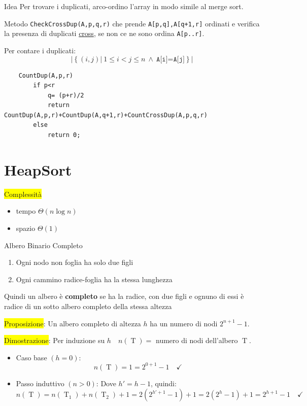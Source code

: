 \documentclass{article}
\begin{document}
\begin{info}{Idea}{}
    Per trovare i duplicati, arco-ordino l'array in modo simile al merge sort.

    Metodo \texttt{CheckCrossDup(A,p,q,r)} che prende \texttt{A[p,q],A[q+1,r]} ordinati e verifica la presenza
    di duplicati \underline{cross}, se non ce ne sono ordina \texttt{A[p..r]}.
\end{info}

Per contare i duplicati:
    \[|\left\{(i,j)|\ 1\le i<j\le n\ \wedge\ \texttt{A[i]=A[j]}\right\}|\]
\begin{verbatim}
    CountDup(A,p,r)
        if p<r
            q= (p+r)/2
            return CountDup(A,p,r)+CountDup(A,q+1,r)+CountCrossDup(A,p,q,r)
        else
            return 0;
\end{verbatim}

\section{HeapSort}
\colorbox{yellow}{Complessità}
\begin{itemize}
    \item tempo \(\Theta(n\log n)\)
    \item spazio \(\Theta(1)\)
\end{itemize}

\begin{defi}{Albero Binario Completo}{}
    \begin{enumerate}
        \item Ogni nodo non foglia ha solo due figli
        \item Ogni cammino radice-foglia ha la stessa lunghezza
    \end{enumerate}
    Quindi un albero è \textbf{completo} se ha la radice, con due figli e ognuno di essi è radice di un sotto albero completo
    della stessa altezza
\end{defi}

\colorbox{yellow}{Proposizione}: Un albero completo di altezza $h$ ha un numero di nodi $2^{n+1}-1$.

\colorbox{yellow}{Dimostrazione}: Per induzione su $h\quad n(\operatorname{T})=$ numero di nodi dell'albero $\operatorname{T}$. 
\begin{itemize}
    \item Caso base $(h=0)$: \[n(\operatorname{T})=1=2^{0+1}-1\quad\checkmark\]
    \item Passo induttivo $(n>0)$: \quad Dove $h'=h-1$, quindi:
    \[n(\operatorname{T})=n(\operatorname{T}_1)+n(\operatorname{T}_2)+1=2\left(2^{h'+1}-1\right)+1=2(2^h-1)+1=2^{h+1}-1\quad\checkmark\]
\end{itemize}
\end{document}
